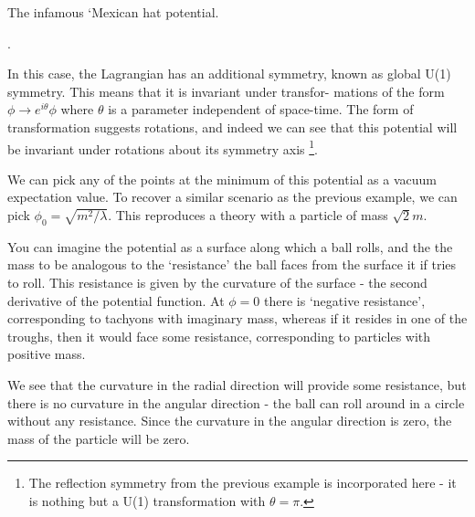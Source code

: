 \begin{marginfigure}
\caption{The infamous `Mexican hat potential.}.
\end{marginfigure}

In this case, the Lagrangian has an additional symmetry, known as
global U(1) symmetry. This means that it is invariant under transfor- mations of the form $\phi\rightarrow e^{i\theta}\phi$ where $\theta$ is a parameter independent of space-time. The form of transformation suggests rotations, and indeed we can see that this potential will be invariant under rotations about its symmetry axis \footnote{ The reflection symmetry from the previous example is incorporated here - it is nothing but a U(1) transformation with $\theta = \pi$.}.

We can pick any of the points at the minimum of this potential as a vacuum expectation value. To recover a similar scenario as the previous example, we can pick $\phi_0 = \sqrt{m^2/\lambda}$. This reproduces a theory with a particle of mass $\sqrt{2}m$.

You can imagine the potential as a surface along which a ball rolls, and the the mass to be analogous to the `resistance' the ball faces from the surface it if tries to roll. This resistance is given by the curvature of the surface - the second derivative of the potential function.
At $\phi = 0$ there is `negative resistance', corresponding to tachyons with imaginary mass, whereas if it resides in one of the troughs, then it would face some resistance, corresponding to particles with positive mass.

We see that the curvature in the radial direction will provide some resistance, but there is no curvature in the angular direction - the ball can roll around in a circle without any resistance. Since the curvature in the angular direction is zero, the mass of the particle will be zero.


